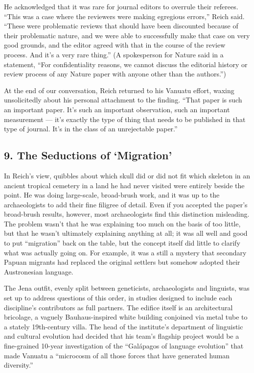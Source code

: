 He acknowledged that it was rare for journal editors to overrule their
referees. ``This was a case where the reviewers were making egregious
errors,'' Reich said. ``These were problematic reviews that should have
been discounted because of their problematic nature, and we were able to
successfully make that case on very good grounds, and the editor agreed
with that in the course of the review process. And it's a very rare
thing.'' (A spokesperson for Nature said in a statement, ``For
confidentiality reasons, we cannot discuss the editorial history or
review process of any Nature paper with anyone other than the
authors.'')

At the end of our conversation, Reich returned to his Vanuatu effort,
waxing unsolicitedly about his personal attachment to the finding.
``That paper is such an important paper. It's such an important
observation, such an important measurement --- it's exactly the type of
thing that needs to be published in that type of journal. It's in the
class of an unrejectable paper.''

\hypertarget{9-the-seductions-of-migration}{%
\subsection{\texorpdfstring{\textbf{9. The Seductions of
`Migration'}}{9. The Seductions of `Migration'}}\label{9-the-seductions-of-migration}}

In Reich's view, quibbles about which skull did or did not fit which
skeleton in an ancient tropical cemetery in a land he had never visited
were entirely beside the point. He was doing large-scale, broad-brush
work, and it was up to the archaeologists to add their fine filigree of
detail. Even if you accepted the paper's broad-brush results, however,
most archaeologists find this distinction misleading. The problem wasn't
that he was explaining too much on the basis of too little, but that he
wasn't ultimately explaining anything at all; it was all well and good
to put ``migration'' back on the table, but the concept itself did
little to clarify what was actually going on. For example, it was a
still a mystery that secondary Papuan migrants had replaced the original
settlers but somehow adopted their Austronesian language.

The Jena outfit, evenly split between geneticists, archaeologists and
linguists, was set up to address questions of this order, in studies
designed to include each discipline's contributors as full partners. The
edifice itself is an architectural bricolage, a vaguely Bauhaus-inspired
white building conjoined via metal tube to a stately 19th-century villa.
The head of the institute's department of linguistic and cultural
evolution had decided that his team's flagship project would be a
fine-grained 10-year investigation of the ``Galápagos of language
evolution'' that made Vanuatu a ``microcosm of all those forces that
have generated human diversity.''

